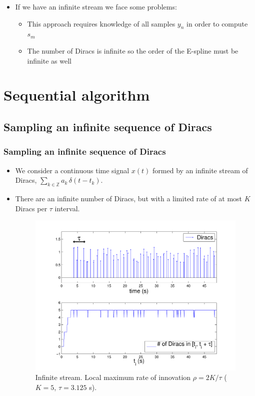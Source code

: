 \documentclass[8pt]{beamer}
\begin{document}
\begin{frame}
\begin{itemize}
\item<7-> If we have an infinite stream we face some problems:
\begin{itemize}
\item This approach requires knowledge of all samples $y_n$ in order to compute $s_m$
\item The number of Diracs is infinite so the order of the E-spline must be infinite as well
\end{itemize}

\end{itemize}

\end{frame}


\section{Sequential algorithm}

\subsection{Sampling an infinite sequence of Diracs}

\begin{frame}
\frametitle{Sampling an infinite sequence of Diracs}

\begin{itemize}

\item We consider a continuous time signal $x(t)$ formed by an infinite stream of Diracs,
$\sum_{k \in \mathbb{Z}} a_k \, \delta \left( t - t_k \right)$.\\[.5cm]

\item<2-> There are an infinite number of Diracs, but with a limited rate
of at most $K$ Diracs per $\tau$ interval.
\begin{figure}[h]
\includegraphics[width=.6\linewidth]{figures/K_diracs_per_tau_interval}
\caption{Infinite stream. Local maximum rate of innovation $\rho = 2K/\tau$ ($K=5$, $\tau=3.125$ s).}
\end{figure}

\end{itemize}

\end{frame}
\end{document}
